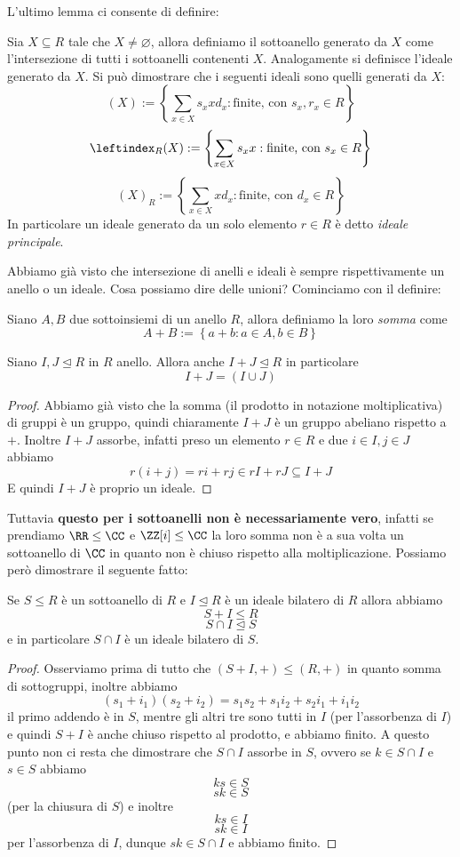 \documentclass[11pt]{scrartcl}
\newcommand{\normal}{\mathrel{\unlhd}}
\newcommand{\eset}{\varnothing}
\begin{document}
	L'ultimo lemma ci consente di definire:
	\begin{definition}
		Sia $X\subseteq R$ tale che $X\ne \eset$, allora definiamo il sottoanello generato da $X$ come l'intersezione di tutti i sottoanelli contenenti $X$. Analogamente si definisce l'ideale generato da $X$. Si può dimostrare che i seguenti ideali sono quelli generati da $X$:
		$$\left(X\right):=\left\{\sum_{x\in X}s_x x d_x:\text{finite, con } s_x,r_x\in R\right\}$$ 
		$$\leftindex_{R}{\left(X\right)}:=\left\{\sum_{x\in X}s_x x :\text{finite, con } s_x\in R\right\}$$ 
		$$\left(X\right)_R:=\left\{\sum_{x\in X} x d_x:\text{finite, con } d_x\in R\right\}$$ 
		In particolare un ideale generato da un solo elemento $r\in R$ è detto \textit{ideale principale}.
	\end{definition}
	Abbiamo già visto che intersezione di anelli e ideali è sempre rispettivamente un anello o un ideale. Cosa possiamo dire delle unioni? Cominciamo con il definire:
	\begin{definition}
		Siano $A,B$ due sottoinsiemi di un anello $R$, allora definiamo la loro \textit{somma} come
		$$A+B:=\left\{a+b:a\in A,b\in B\right\}$$
	\end{definition}
	\begin{lemma}
		Siano $I,J\normal R$ in $R$ anello. Allora anche $I+J\normal R$ in particolare
		$$I+J=\left(I\cup J\right)$$
	\end{lemma}
	\begin{proof}
		Abbiamo già visto che la somma (il prodotto in notazione moltiplicativa) di gruppi è un gruppo, quindi chiaramente $I+J$ è un gruppo abeliano rispetto a $+$. Inoltre $I+J$ assorbe, infatti preso un elemento $r\in R$ e due $i\in I, j\in J$ abbiamo
		$$r(i+j)=ri+rj\in rI+rJ\subseteq I+J$$
		E quindi $I+J$ è proprio un ideale.
	\end{proof}
	Tuttavia \textbf{questo per i sottoanelli non è necessariamente vero}, infatti se prendiamo $\RR\le \CC$ e $\ZZ[i]\le \CC$ la loro somma non è a sua volta un sottoanello di $\CC$ in quanto non è chiuso rispetto alla moltiplicazione. Possiamo però dimostrare il seguente fatto:
	\begin{lemma}
		Se $S\le R$ è un sottoanello di $R$ e $I\normal R$ è un ideale bilatero di $R$ allora abbiamo
		$$S+I\le R$$
		$$S\cap I \normal S$$
		e in particolare $S\cap I$ è un ideale bilatero di $S$.
	\end{lemma}
	\begin{proof}
		Osserviamo prima di tutto che $(S+I,+)\le (R,+)$ in quanto somma di sottogruppi, inoltre abbiamo
		$$(s_1+i_1)(s_2+i_2)=s_1s_2+s_1i_2+s_2i_1+i_1i_2$$
		il primo addendo è in $S$, mentre gli altri tre sono tutti in $I$ (per l'assorbenza di $I$) e quindi $S+I$ è anche chiuso rispetto al prodotto, e abbiamo finito. A questo punto non ci resta che dimostrare che $S\cap I$ assorbe in $S$, ovvero se $k\in S\cap I$ e $s\in S$ abbiamo
		$$ks\in S$$
		$$sk\in S$$
		(per la chiusura di $S$) e inoltre
		$$ks\in I$$
		$$sk\in I$$
		per l'assorbenza di $I$, dunque $sk\in S\cap I$ e abbiamo finito.
	\end{proof}
\end{document}
